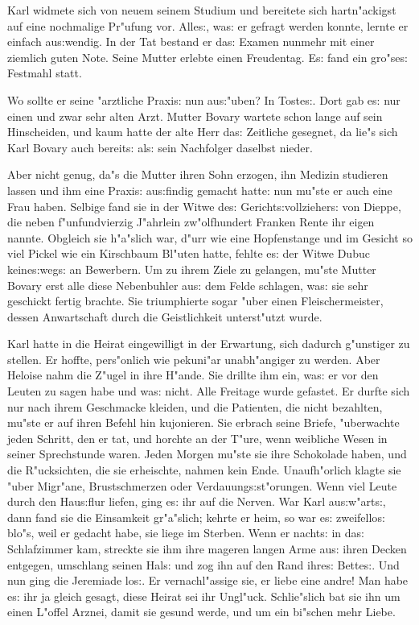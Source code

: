 \documentclass[oneside,12pt]{book}
\newcommand{\s}{s:}%
\begin{document}
Karl widmete sich von neuem seinem Studium und bereitete sich
hart\-n"ackigst auf eine nochmalige Pr"ufung vor. Alle{\s}, wa{\s}
er gefragt werden konnte, lernte er einfach au{\s}wendig. In der
Tat bestand er da{\s} Examen nunmehr mit einer ziemlich guten
Note. Seine Mutter erlebte einen Freudentag. E{\s} fand ein
gro"se{\s} Festmahl statt.

Wo sollte er seine "arztliche Praxi{\s} nun au{\s}"uben? In
Toste{\s}. Dort gab e{\s} nur einen und zwar sehr alten Arzt.
Mutter Bovary wartete schon lange auf sein Hinscheiden, und kaum
hatte der alte Herr da{\s} Zeitliche gesegnet, da lie"s sich Karl
Bovary auch bereit{\s} al{\s} sein Nachfolger daselbst nieder.

Aber nicht genug, da"s die Mutter ihren Sohn erzogen, ihn Medizin
studieren lassen und ihm eine Praxi{\s} au{\s}findig gemacht
hatte: nun mu"ste er auch eine Frau haben. Selbige fand sie in der
Witwe de{\s} Gericht{\s}vollzieher{\s} von Dieppe, die neben
f"unfundvierzig J"ahrlein zw"olfhundert Franken Rente ihr eigen
nannte. Obgleich sie h"a"slich war, d"urr wie eine Hopfenstange
und im Gesicht so viel Pickel wie ein Kirschbaum Bl"uten hatte,
fehlte e{\s} der Witwe Dubuc keine{\s}weg{\s} an Bewerbern. Um zu
ihrem Ziele zu gelangen, mu"ste Mutter Bovary erst alle diese
Nebenbuhler au{\s} dem Felde schlagen, wa{\s} sie sehr geschickt
fertig brachte. Sie triumphierte sogar "uber einen
Fleischermeister, dessen Anwartschaft durch die Geistlichkeit
unterst"utzt wurde.

Karl hatte in die Heirat eingewilligt in der Erwartung, sich
dadurch g"unstiger zu stellen. Er hoffte, pers"onlich wie
pekuni"ar unabh"angiger zu werden. Aber Heloise nahm die Z"ugel in
ihre H"ande. Sie drillte ihm ein, wa{\s} er vor den Leuten zu
sagen habe und wa{\s} nicht. Alle Freitage wurde gefastet. Er
durfte sich nur nach ihrem Geschmacke kleiden, und die Patienten,
die nicht bezahlten, mu"ste er auf ihren Befehl hin kujonieren.
Sie erbrach seine Briefe, "uberwachte jeden Schritt, den er tat,
und horchte an der T"ure, wenn weibliche Wesen in seiner
Sprechstunde waren. Jeden Morgen mu"ste sie ihre Schokolade haben,
und die R"ucksichten, die sie erheischte, nahmen kein Ende.
Unaufh"orlich klagte sie "uber Migr"ane, Brustschmerzen oder
Verdauung{\s}st"orungen. Wenn viel Leute durch den Hau{\s}flur
liefen, ging e{\s} ihr auf die Nerven. War Karl au{\s}w"art{\s},
dann fand sie die Einsamkeit gr"a"slich; kehrte er heim, so war
e{\s} zweifello{\s} blo"s, weil er gedacht habe, sie liege im
Sterben. Wenn er nacht{\s} in da{\s} Schlafzimmer kam, streckte
sie ihm ihre mageren langen Arme au{\s} ihren Decken entgegen,
umschlang seinen Hal{\s} und zog ihn auf den Rand ihre{\s}
Bette{\s}. Und nun ging die Jeremiade lo{\s}. Er vernachl"assige
sie, er liebe eine andre! Man habe e{\s} ihr ja gleich gesagt,
diese Heirat sei ihr Ungl"uck. Schlie"slich bat sie ihn um einen
L"offel Arznei, damit sie gesund werde, und um ein bi"schen mehr
Liebe.
\end{document}

